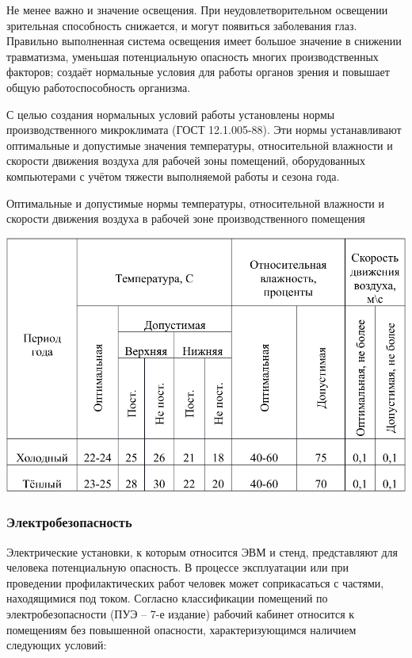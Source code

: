 Не менее важно и значение освещения. При неудовлетворительном освещении зрительная способность снижается, и могут появиться заболевания глаз. Правильно выполненная система освещения имеет большое значение в снижении травматизма, уменьшая потенциальную опасность многих производственных факторов; создаёт нормальные условия для работы органов зрения и повышает общую работоспособность организма.

С целью создания нормальных условий работы установлены нормы производственного микроклимата (ГОСТ 12.1.005-88)\cite{OT10}. Эти нормы устанавливают оптимальные и допустимые значения температуры, относительной влажности и скорости движения воздуха для рабочей зоны помещений, оборудованных компьютерами с учётом тяжести выполняемой работы и сезона года.

\begin{table}[!ht]
\caption{Оптимальные и допустимые нормы температуры, относительной влажности и скорости движения воздуха в рабочей зоне производственного помещения}
\centering
\includegraphics[page=1, width=1\linewidth]{secure_table.pdf}
\label{tab:micro_climat}
\end{table}

\subsubsection{Электробезопасность}

Электрические установки, к которым относится ЭВМ и стенд, представляют для человека потенциальную опасность. В процессе эксплуатации или при проведении профилактических работ человек может соприкасаться с частями, находящимися под током. Согласно классификации помещений по электробезопасности (ПУЭ – 7-е издание) рабочий кабинет относится к помещениям без повышенной опасности, характеризующимся наличием следующих условий:


